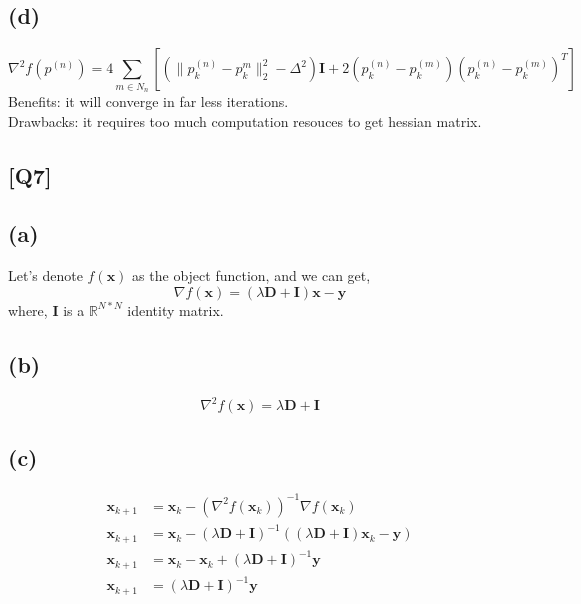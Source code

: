 \documentclass[12pt, a4 paper]{article}
\begin{document}
\begin{framed}
        \subsection{(d)}
        $$
        \nabla^{2} f(p^{(n)}) = 4 \sum\limits_{m\in N_{n}} \left[ (\lVert
         p_{k}^{(n)}-p_{k}^{m} \rVert_{2}^{2} - \Delta^{2}) \boldsymbol{I}
         + 2(p_{k}^{(n)}-p_{k}^{(m)})(p_{k}^{(n)}-p_{k}^{(m)})^{T} \right]
        $$
        \indent Benefits: it will converge in far less iterations.\\
        \indent Drawbacks: it requires too much computation resouces to get hessian matrix.
    \end{framed}

    \begin{framed}
        \section{[Q7]}
        \subsection{(a)}
        Let's denote $f(\boldsymbol{x})$ as the object function, and we can get,
        $$
        \nabla f(\boldsymbol{x}) = (\lambda \boldsymbol{D} + \boldsymbol{I}) \boldsymbol{x} - \boldsymbol{y}
        $$
        \indent where, $\boldsymbol{I}$ is a $\mathbb{R}^{N * N}$ identity matrix.

        \subsection{(b)}
        $$
        \nabla^{2} f(\boldsymbol{x}) = \lambda \boldsymbol{D} + \boldsymbol{I}
        $$

        \subsection{(c)}
        \begin{align}
            \boldsymbol{x}_{k+1} &= \boldsymbol{x}_{k} - (\nabla^{2} f(\boldsymbol{x}_{k}))^{-1} \nabla f(\boldsymbol{x}_{k}) \\
            \boldsymbol{x}_{k+1} &= \boldsymbol{x}_{k} - (\lambda \boldsymbol{D} + \boldsymbol{I})^{-1} ((\lambda \boldsymbol{D} + \boldsymbol{I}) \boldsymbol{x}_{k}-\boldsymbol{y})\\
            \boldsymbol{x}_{k+1} &= \boldsymbol{x}_{k} - \boldsymbol{x}_{k} + (\lambda \boldsymbol{D} + \boldsymbol{I})^{-1} \boldsymbol{y}\\
            \boldsymbol{x}_{k+1} &= (\lambda \boldsymbol{D} + \boldsymbol{I})^{-1} \boldsymbol{y}
        \end{align}


\end{framed}
\end{document}
